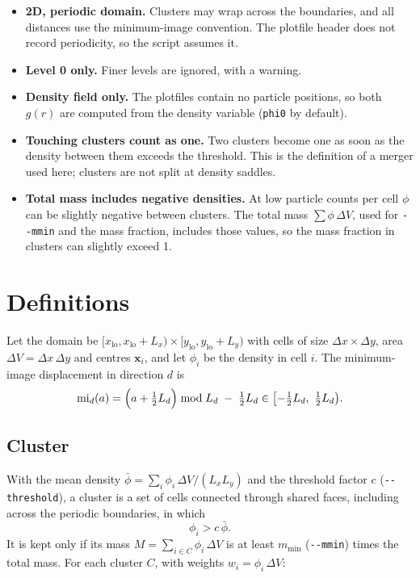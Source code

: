 \documentclass[11pt]{article}
\newcommand{\code}[1]{\texttt{#1}}
\begin{document}
\begin{itemize}
  \item \textbf{2D, periodic domain.} Clusters may wrap across the boundaries,
        and all distances use the minimum-image convention. The plotfile
        header does not record periodicity, so the script assumes it.
  \item \textbf{Level 0 only.} Finer levels are ignored, with a warning.
  \item \textbf{Density field only.} The plotfiles contain no particle
        positions, so both $g(r)$ are computed from the density variable
        (\code{phi0} by default).
  \item \textbf{Touching clusters count as one.} Two clusters become one as soon
        as the density between them exceeds the threshold. This is the
        definition of a merger used here; clusters are not split at density
        saddles.
  \item \textbf{Total mass includes negative densities.} At low particle counts
        per cell $\phi$ can be slightly negative between clusters. The total
        mass $\sum\phi\,\Delta V$, used for \code{-{}-mmin} and the mass fraction,
        includes those values, so the mass fraction in clusters can slightly
        exceed 1.
\end{itemize}

\section{Definitions}

Let the domain be $[x_{\mathrm{lo}}, x_{\mathrm{lo}}+L_x)\times[y_{\mathrm{lo}}, y_{\mathrm{lo}}+L_y)$
with cells of size $\Delta x\times\Delta y$, area $\Delta V = \Delta x\,\Delta y$
and centres $\mathbf{x}_i$, and let $\phi_i$ be the density in cell $i$. The
minimum-image displacement in direction $d$ is
\begin{equation}
  \operatorname{mi}_d(a) = \Bigl(a + \tfrac12 L_d\Bigr) \bmod L_d \;-\; \tfrac12 L_d
  \in \bigl[-\tfrac12 L_d,\ \tfrac12 L_d\bigr).
\end{equation}

\subsection{Cluster}

With the mean density $\bar\phi = \sum_i \phi_i\,\Delta V/(L_xL_y)$ and the
threshold factor $c$ (\code{-{}-threshold}), a cluster is a set of cells connected
through shared faces, including across the periodic boundaries, in which
\begin{equation}
  \phi_i > c\,\bar\phi .
\end{equation}
It is kept only if its mass $M = \sum_{i\in C}\phi_i\,\Delta V$ is at least
$m_{\min}$ (\code{-{}-mmin}) times the total mass. For each cluster $C$, with
weights $w_i = \phi_i\,\Delta V$:
\end{document}
